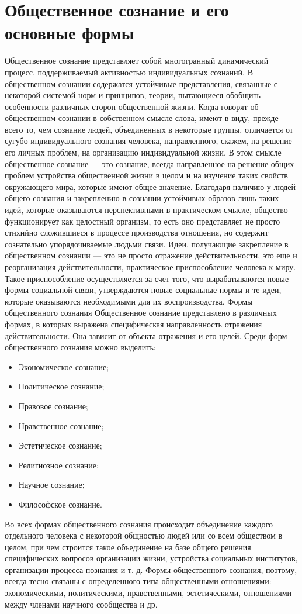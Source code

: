 \documentclass[12pt]{article}
\begin{document}
\section{Общественное сознание и его основные формы}
Общественное  сознание  представляет  собой  многогранный  динамический  процесс,  поддерживаемый
активностью  индивидуальных  сознаний.  В  общественном  сознании  содержатся  устойчивые  представления,
связанные с некоторой системой норм и принципов, теории, пытающиеся обобщить особенности различных
сторон общественной жизни. Когда говорят об общественном сознании в собственном смысле слова, имеют в
виду,  прежде  всего  то,  чем  сознание  людей,  объединенных  в  некоторые  группы,  отличается  от  сугубо
индивидуального сознания человека, направленного, скажем, на решение его личных проблем, на организацию
индивидуальной  жизни.  В  этом  смысле  общественное  сознание  —  это  сознание,  всегда  направленное  на
решение общих проблем устройства общественной жизни в целом и на изучение таких свойств окружающего
мира, которые имеют общее значение.
Благодаря наличию у людей общего сознания и закреплению в сознании устойчивых образов лишь таких идей,
которые  оказываются  перспективными  в  практическом  смысле,  общество  функционирует  как  целостный
организм, то есть оно представляет не просто стихийно сложившиеся в процессе производства отношения, но
содержит сознательно упорядочиваемые людьми связи.
Идеи, получающие закрепление в общественном сознании — это не просто отражение действительности, это
еще и реорганизация действительности, практическое приспособление человека к миру. Такое приспособление
осуществляется  за  счет  того,  что  вырабатываются  новые  формы  социальной  связи,  утверждаются  новые
социальные нормы и те идеи, которые оказываются необходимыми для их воспроизводства.
Формы общественного сознания
Общественное  сознание  представлено  в  различных  формах,  в  которых  выражена  специфическая
направленность отражения действительности. Она зависит от объекта отражения и его целей. Среди форм
общественного сознания можно выделить:
\begin{itemize}
  \item Экономическое сознание;
  \item Политическое сознание;
\item Правовое сознание;
\item Нравственное сознание;
\item Эстетическое сознание;
\item Религиозное сознание;
\item Научное сознание;
\item Философское сознание.
\end{itemize}
Во всех формах общественного сознания происходит объединение каждого отдельного человека с некоторой
общностью людей  или со всем  обществом в  целом, при  чем строится такое объединение  на базе  общего
решения  специфических  вопросов  организации  жизни,  устройства  социальных  институтов,  организации
процесса познания и т. д. Формы общественного сознания, поэтому, всегда тесно связаны с определенного типа
общественными  отношениями:  экономическими,  политическими,  нравственными,  эстетическими,
отношениями между членами научного сообщества и др.
\end{document}
